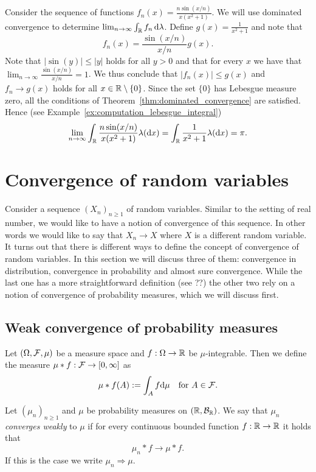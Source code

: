 \begin{example}
Consider the sequence of functions $f_n(x) = \frac{n \sin(x/n)}{x(x^2+1)}$. We will use dominated convergence to determine $\lim_{n \to \infty} \int_{\mathbb R} f_n \, \mathrm{d} \lambda$. Define $g(x) = \frac{1}{x^2 +1}$ and note that 
\[
	f_n(x) = \frac{\sin(x/n)}{x/n} g(x).
\]
Note that $|\sin(y)| \le |y|$ holds for all $y > 0$ and that for every $x$ we have that $\lim_{n \to \infty} \frac{\sin(x/n)}{x/n} = 1$. We thus conclude that $|f_n(x)| \le g(x)$ and $f_n \to g(x)$ holds for all $x \in \mathbb R \setminus \{0\}$. Since the set $\{0\}$ has Lebesgue measure zero, all the conditions of Theorem~\ref{thm:dominated_convergence} are satisfied. Hence (see Example~\ref{ex:computation_lebesgue_integral})
\[
	\lim_{n \to \infty} \int_{\mathbb R} \frac{n \sin(x/n)}{x(x^2+1)} \lambda(\mathrm{d} x) 
	= \int_{\mathbb R} \frac{1}{x^2 +1} \lambda(\mathrm{d} x) = \pi.
\]
\end{example}

\section{Convergence of random variables}

Consider a sequence $(X_n)_{n \ge 1}$ of random variables. Similar to the setting of real number, we would like to have a notion of convergence of this sequence. In other words we would like to say that $X_n \to X$ where $X$ is a different random variable. It turns out that there is different ways to define the concept of convergence of random variables. In this section we will discuss three of them: convergence in distribution, convergence in probability and almost sure convergence. While the last one has a more straightforward definition (see ??) the other two rely on a notion of convergence of probability measures, which we will discuss first.

\subsection{Weak convergence of probability measures}

Let $(\Omega, \mathcal F, \mu)$ be a measure space and $f : \Omega \to \mathbb R$ be $\mu$-integrable. Then we define the measure $\mu \ast f : \mathcal F \to [0,\infty]$ as
\begin{equation}
	\mu \ast f (A) := \int_A f \mathrm{d} \mu \quad \text{for } A \in \mathcal F.
\end{equation}

\begin{definition}
Let $(\mu_n)_{n \ge 1}$ and $\mu$ be probability measures on $(\mathbb R, \mathcal B_{\mathbb R})$. We say that $\mu_n$ \emph{converges weakly} to $\mu$ if for every continuous bounded function $f : \mathbb R \to \mathbb R$ it holds that
\[
	\mu_n \ast f \to \mu \ast f.
\]
If this is the case we write $\mu_n \Rightarrow \mu$.
\end{definition}

